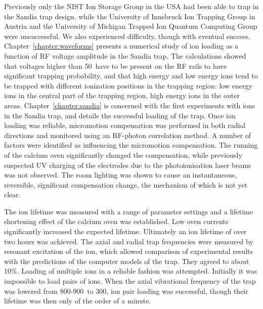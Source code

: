 Previously only the NIST Ion Storage Group in the USA had been able to trap in the Sandia trap design, while the University of Innsbruck Ion Trapping Group in Austria and the University of Michigan Trapped Ion Quantum Computing Group were unsuccessful. We also experienced difficulty, though with eventual success. Chapter~\ref{chapter:waveforms} presents a numerical study of ion loading as a function of RF voltage amplitude in the Sandia trap. The calculations showed that voltages higher than 50\V\, have to be present on the RF rails to have significant trapping probability, and that high energy and low energy ions tend to be trapped with different ionization positions in the trapping region: low energy ions in the central part of the trapping region, high energy ions in the outer areas. Chapter~\ref{chapter:sandia} is concerned with the first experiments with ions in the Sandia trap, and details the successful loading of the trap. Once ion loading was reliable, micromotion compensation was performed in both radial directions and monitored using an RF-photon correlation method. A number of factors were identified as influencing the micromotion compensation. The running of the calcium oven significantly changed the compensation, while previously suspected UV charging of the electrodes due to the photoionisation laser beams was not observed. The room lighting was shown to cause an instantaneous, reversible, significant compensation change, the mechanism of which is not yet clear.

 The ion lifetime was measured with a range of parameter settings and a lifetime shortening effect of the calcium oven was established. Low oven currents significantly increased the expected lifetime. Ultimately an ion lifetime of over two hours was achieved. The axial and radial trap frequencies were measured by resonant excitation of the ion, which allowed comparison of experimental results with the predictions of the computer models of the trap. They agreed to about $10\%$. Loading of multiple ions in a reliable fashion was attempted. Initially it was impossible to load pairs of ions. When the axial vibrational frequency of the trap was lowered from 800-900\kHz\, to 300\kHz, ion pair loading was successful, though their lifetime was then only of the order of a minute.

